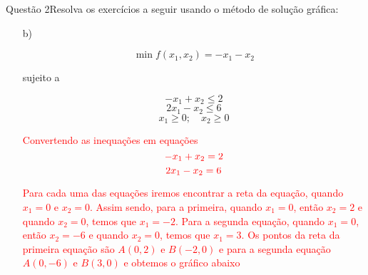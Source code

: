 \documentclass[12pt]{article}
\begin{document}
\begin{section}{Questão 2}{Resolva os exercícios a seguir usando o método de solução gráfica:}
\begin{itemize}
\noindent \textcolor{red}{Como todas as restrições se mantiveram verdadeiras, então a área amarela é onde encontra-se a nossa solução.}\\

\noindent \textcolor{red}{Agora irei utilizar múltiplos dos valores de $x_1$ e $x_2$ e analisar como a função se comporta e se seus valores ficam dentro da região amarela. Como múltiplos irei usar 2, 4 e 8 e encontrei os pontos da reta de lucro para cada um desses valores.}

$$
\textcolor{red}{x_1 + 2x_2 = 2 \rightarrow M(0,1) \textrm{ e } N(2,0)}
$$
$$
\textcolor{red}{x_1 + 2x_2 =4 \rightarrow M(0,2) \textrm{ e } N(4,0)}
$$
$$
\textcolor{red}{x_1 + 2x_2 =8 \rightarrow M(0,4) \textrm{ e } N(8,0)}
$$

\noindent \textcolor{red}{Gerando as retas no nosso gráfico temos:}

\begin{figure}[H]
    \centering
    \texttt{[image: Figuras/atv5/questao2a2.PNG]}
\end{figure}

\noindent \textcolor{red}{A reta preta refere-se a equação $x_1 + 2x_2 = 2$, a roxa a $x_1 + 2x_2 = 4$ e a rosa a $x_1 + 2x_2 = 8$. Notar que a região abaixo da reta roxa tracejada é maior que a área abaixo da reta preta e que a reta rosa está fora da região de solução. A reta roxa toca na reta de $x_1=2$, portanto já temos o valor de $x_1$ e podemos encontrar o valor de $x_2$ que é 1. Então, 4 é o valor máximo dessa função.}


\item[b)]

$$
\min f(x_1,x_2) = -x_1 -x_2
$$

sujeito a 

$$
-x_1 + x_2 \leq 2
$$
$$
2x_1 - x_2 \leq 6
$$
$$
x_1 \geq 0; \quad x_2 \geq 0
$$

\textcolor{red}{Convertendo as inequações em equações}
$$
\textcolor{red}{-x_1 + x_2= 2}
$$
$$
\textcolor{red}{2x_1 - x_2 = 6}
$$

\noindent \textcolor{red}{Para cada uma das equações iremos encontrar a reta da equação, quando $x_1=0$ e $x_2=0$. Assim sendo, para a primeira, quando $x_1=0$, então $x_2 =2$ e quando $x_2=0$, temos que $x_1 =-2$. Para a segunda equação, quando $x_1=0$, então $x_2 =-6$ e quando $x_2=0$, temos que $x_1 =3$.  Os pontos da reta da primeira equação são $A(0,2)$ e $B(-2,0)$ e para a segunda equação $A(0,-6)$ e $B(3,0)$ e obtemos o gráfico abaixo}


\end{itemize}
\end{section}
\end{document}
